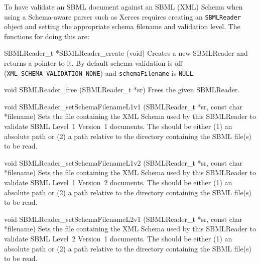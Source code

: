\documentclass{sbmlmanual}
\begin{document}
To have \libsbml{} validate an SBML document against an SBML (XML) Schema
when using a Schema-aware parser such as Xerces requires creating an
\texttt{SBMLReader} object and setting the appropriate schema filename and
validation level.  The functions for doing this are:


\begin{methoddef}{SBMLReader\_t *SBMLReader\_create (void)}
  Creates a new SBMLReader and returns a pointer to it.  By default
  schema validation is off (\texttt{XML\_SCHEMA\_VALIDATION\_NONE})
  and \texttt{schemaFilename} is \texttt{NULL}.
\end{methoddef}


\begin{methoddef}{void SBMLReader\_free (SBMLReader\_t *sr)}
  Frees the given SBMLReader.
\end{methoddef}


\begin{methoddef}{void SBMLReader\_setSchemaFilenameL1v1 (SBMLReader\_t *sr, const char *filename)}
  Sets the file containing the XML Schema used by this SBMLReader to
  validate SBML Level~1 Version~1 documents.  The 
  should be either (1) an absolute path or (2) a path relative to the
  directory containing the SBML file(s) to be read.
\end{methoddef}


\begin{methoddef}{void SBMLReader\_setSchemaFilenameL1v2 (SBMLReader\_t *sr, const char *filename)}
  Sets the file containing the XML Schema used by this SBMLReader to
  validate SBML Level~1 Version~2 documents.  The 
  should be either (1) an absolute path or (2) a path relative to the
  directory containing the SBML file(s) to be read.
\end{methoddef}


\begin{methoddef}{void SBMLReader\_setSchemaFilenameL2v1 (SBMLReader\_t *sr, const char *filename)}
  Sets the file containing the XML Schema used by this SBMLReader to
  validate SBML Level~2 Version~1 documents.  The 
  should be either (1) an absolute path or (2) a path relative to the
  directory containing the SBML file(s) to be read.
\end{methoddef}
\end{document}
